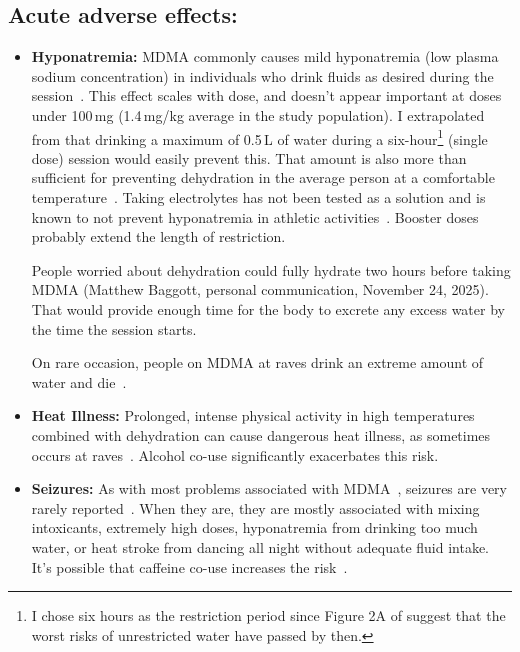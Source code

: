 \documentclass[11pt,oneside]{book}
\let\cite\parencite
\begin{document}
\subsection*{Acute adverse effects:}
\begin{itemize}
    \item \textbf{Hyponatremia:} MDMA commonly causes mild hyponatremia (low plasma sodium concentration) in individuals who drink fluids as desired during the session~\cite{atilaHyponatremia}. This effect scales with dose, and doesn't appear important at doses under 100\,mg (1.4\,mg/kg average in the study population). I extrapolated from \textcite{baggottWater} that drinking a maximum of 0.5\,L of water during a six-hour\footnote{I chose six hours as the restriction period since Figure 2A of \textcite{atilaHyponatremia} suggest that the worst risks of unrestricted water have passed by then.} (single dose) session would easily prevent this. That amount is also more than sufficient for preventing dehydration in the average person at a comfortable temperature~\cite{valtinWater}. Taking electrolytes has not been tested as a solution and is known to not prevent hyponatremia in athletic activities~\cite{hew2008statement}. Booster doses probably extend the length of restriction.
    
    People worried about dehydration could fully hydrate two hours before taking MDMA (Matthew Baggott, personal communication, November 24, 2025). That would provide enough time for the body to excrete any excess water by the time the session starts.

    On rare occasion, people on MDMA at raves drink an extreme amount of water and die~\cite{riggDeaths}.
    \item \textbf{Heat Illness:} Prolonged, intense physical activity in high temperatures combined with dehydration can cause dangerous heat illness, as sometimes occurs at raves~\cite{vanOverheatingAlcohol}. Alcohol co-use significantly exacerbates this risk.
    \item \textbf{Seizures:} As with most problems associated with MDMA~\cite{riggDeaths}, seizures are very rarely reported~\cite{freidelSeizures}. When they are, they are mostly associated with mixing intoxicants, extremely high doses, hyponatremia from drinking too much water, or heat stroke from dancing all night without adequate fluid intake. It's possible that caffeine co-use increases the risk~\cite{vanattouCaffeine}.
\end{itemize}
\end{document}
